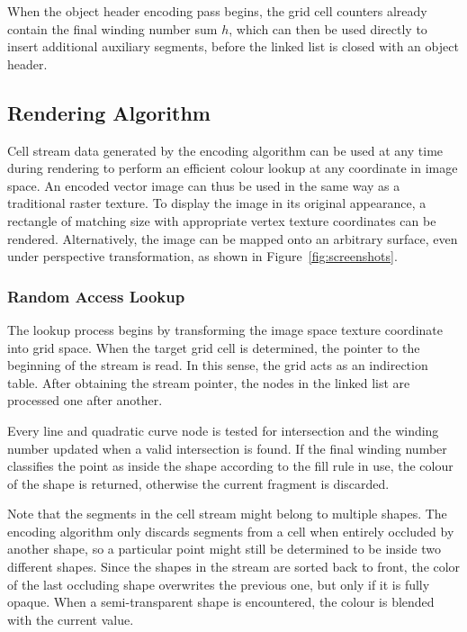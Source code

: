\documentclass[11pt,a4paper,twoside]{article}
\begin{document}
When the object header encoding pass begins, the grid cell counters already contain the final winding number sum $h$, which can then be used directly to insert additional auxiliary segments, before the linked list is closed with an object header.

\subsection {Rendering Algorithm}

Cell stream data generated by the encoding algorithm can be used at any time during rendering to perform an efficient colour lookup at any coordinate in image space. An encoded vector image can thus be used in the same way as a traditional raster texture. To display the image in its original appearance, a rectangle of matching size with appropriate vertex texture coordinates can be rendered. Alternatively, the image can be mapped onto an arbitrary surface, even under perspective transformation, as shown in Figure~\ref{fig:screenshots}.

\subsubsection{Random Access Lookup}

The lookup process begins by transforming the image space texture coordinate into grid space. When the target grid cell is determined, the pointer to the beginning of the stream is read. In this sense, the grid acts as an indirection table. After obtaining the stream pointer, the nodes in the linked list are processed one after another.

Every line and quadratic curve node is tested for intersection and the winding number updated when a valid intersection is found. If the final winding number classifies the point as inside the shape according to the fill rule in use, the colour of the shape is returned, otherwise the current fragment is discarded.

Note that the segments in the cell stream might belong to multiple shapes. The encoding algorithm only discards segments from a cell when entirely occluded by another shape, so a particular point might still be determined to be inside two different shapes. Since the shapes in the stream are sorted back to front, the color of the last occluding shape overwrites the previous one, but only if it is fully opaque. When a semi-transparent shape is encountered, the colour is blended with the current value.
\end{document}
